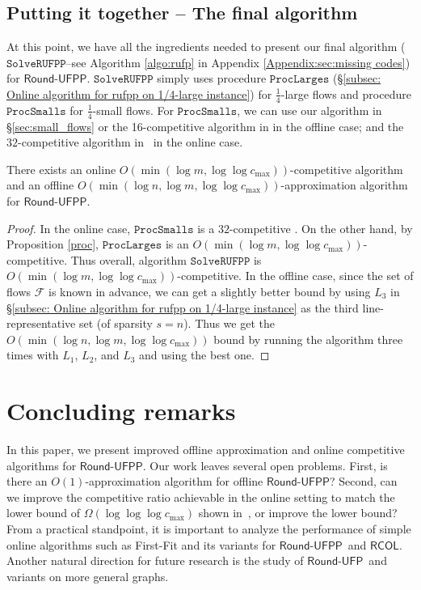\documentclass[a4paper,UKenglish]{lipics-v2016}
\newcommand{\rufp}{\mbox{$\mathsf{Round}$-$\mathsf{UFP}$}}
\newcommand{\rufpp}{\mbox{$\mathsf{Round}$-$\mathsf{UFPP}$}}
\newcommand{\rcol}{\mbox{$\mathsf{RCOL}$}}
\theoremstyle{plain}
\begin{document}
\subsection{Putting it together -- The final algorithm} \label{sub:finalAlg}
At this point, we have all the ingredients needed to present our final algorithm ($\mathtt{SolveRUFPP}$--see Algorithm \ref{algo:rufp} in Appendix \ref{Appendix:sec:missing codes}) for \rufpp. $\mathtt{SolveRUFPP}$ simply uses procedure $\mathtt{ProcLarges}$ (\S\ref{subsec: Online algorithm for rufpp on 1/4-large instance}) for $\frac{1}{4}$-large flows and  procedure $\mathtt{ProcSmalls}$ for $\frac{1}{4}$-small flows. For $\mathtt{ProcSmalls}$, we can use our algorithm in \S\ref{sec:small_flows} or the 16-competitive algorithm in \cite{Elbassioni} in the offline case; and the $32$-competitive algorithm in~\cite{epstein} in the online case.

\begin{theorem}
There exists an online $O(\min(\log m, \log\log c_{\max}))$-competitive algorithm and an offline $O(\min (\log n, \log m, \log\log c_{\max}))$-approximation algorithm for $\rufpp$.
\end{theorem}
\begin{proof}
In the online case, $\mathtt{ProcSmalls}$ is a $32$-competitive \cite{epstein}. On the other hand, by Proposition \ref{proc}, $\mathtt{ProcLarges}$ is an $O(\min(\log m, \log\log c_{\max}))$-competitive. Thus overall, algorithm $\mathtt{SolveRUFPP}$ is $O(\min(\log m, \log\log c_{\max}))$-competitive. In the offline case, since the set of flows $\mathcal{F}$ is known in advance, we can get a slightly better bound by using $L_3$ in \S\ref{subsec: Online algorithm for rufpp on 1/4-large instance} as the third line-representative set (of sparsity $s=n$). Thus we get the $O(\min (\log n, \log m, \log\log c_{\max}))$ bound by running the algorithm three times with $L_1$, $L_2$, and $L_3$ and using the best one.
\end{proof}


\section{Concluding remarks}
In this paper, we present improved offline approximation and online competitive algorithms for \rufpp.  Our work leaves several open problems.  First, is there an $O(1)$-approximation algorithm for offline \rufpp?  Second, can we improve the competitive ratio achievable in the online setting to match the lower bound of $\Omega(\log\log\log c_{\max})$ shown in~\cite{epstein}, or improve the lower bound?  From a practical standpoint, it is important to analyze the performance of simple online algorithms such as  First-Fit and its variants for \rufpp\ and \rcol.  Another natural direction for future research is the study of \rufp\ and variants on more general graphs. 
\end{document}
